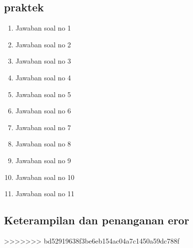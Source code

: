 \subsection{praktek}
\begin{enumerate}
    \item Jawaban soal no 1
    
    \item Jawaban soal no 2
    
    \item Jawaban soal no 3
    
    \item Jawaban soal no 4
    
    \item Jawaban soal no 5
    
    \item Jawaban soal no 6
    
    \item Jawaban soal no 7
    
    \item Jawaban soal no 8
    
    \item Jawaban soal no 9
    
    \item Jawaban soal no 10
    
    \item Jawaban soal no 11
    
\end{enumerate}

\subsection{Keterampilan dan penanganan eror}
    
>>>>>>> bd52919638f3be6eb154ac04a7c1450a59dc788f

